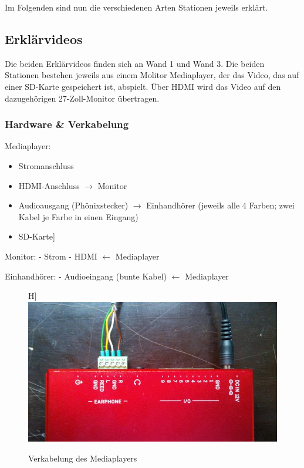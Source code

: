 \documentclass [titlepage,a4paper]{article}
\begin{document}
Im Folgenden sind nun die verschiedenen Arten Stationen jeweils erklärt. 

\subsection{Erklärvideos}

Die beiden Erklärvideos finden sich an Wand 1 und Wand 3. Die beiden Stationen bestehen jeweils aus einem Molitor Mediaplayer, der das Video, das auf einer SD-Karte gespeichert ist, abspielt. Über HDMI wird das Video auf den dazugehörigen 27-Zoll-Monitor übertragen. 

\subsubsection{Hardware \& Verkabelung}

Mediaplayer:
\begin{itemize}
    \item Stromanschluss
    \item HDMI-Anschluss $\rightarrow$ Monitor
    \item Audioausgang (Phönixstecker) $\rightarrow$ Einhandhörer (jeweils alle 4 Farben; zwei Kabel je Farbe in einen Eingang)
    \item SD-Karte] 
\end{itemize}


Monitor:
- Strom
- HDMI $\leftarrow$ Mediaplayer

Einhandhörer:
- Audioeingang (bunte Kabel) $\leftarrow$ Mediaplayer

\begin{figure} H]
    \centering
    \includegraphics [width=1\textwidth]{images/AP01_Wiring_Detail.jpg}
    \caption{Verkabelung des Mediaplayers}
    \label{verkabelung_mediaplayer}
\end{figure}
\end{document}
